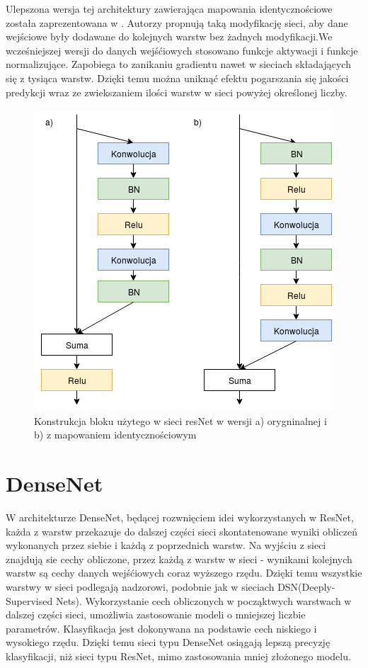 \documentclass[a4paper,11pt,twoside]{report}
\theoremstyle{definition}
\begin{document}
Ulepszona wersja tej architektury zawierająca mapowania identycznościowe została zaprezentowana w \cite{preResnet}. Autorzy propnują taką modyfikację sieci, aby dane wejściowe były dodawane do kolejnych warstw bez żadnych modyfikacji.We wcześniejszej wersji do danych wejśćiowych stosowano funkcje aktywacji i funkcje normalizujące. Zapobiega to zanikaniu gradientu nawet w sieciach składających się z tysiąca warstw. Dzięki temu można uniknąć efektu pogarszania się jakości predykcji wraz ze zwiekszaniem ilości warstw w sieci powyżej określonej liczby.

\begin{figure}[h!]
	\centering
	\includegraphics{resnetBlock}
	\caption{Konstrukcja bloku użytego w sieci resNet w wersji a) orygninalnej i b) z mapowaniem identycznościowym}
\end{figure}

\section{DenseNet}

W architekturze DenseNet, będącej rozwnięciem idei wykorzystanych w ResNet, każda z warstw przekazuje do dalszej części sieci skontatenowane wyniki obliczeń wykonanych przez siebie i każdą z poprzednich warstw. Na wyjściu z sieci znajdują sie cechy obliczone, przez każdą z warstw w sieci - wynikami kolejnych warstw są cechy danych wejśćiowych coraz wyższego rzędu. Dzięki temu wszystkie warstwy w sieci podlegają nadzorowi, podobnie jak w sieciach DSN(Deeply-Supervised Nets)\cite{DSN}. Wykorzystanie cech obliczonych w począktwych warstwach w dalszej części sieci, umożliwia zastosowanie modeli o mniejszej liczbie parametrów. Klasyfikacja jest dokonywana na podstawie cech niskiego i wysokiego rzędu. Dzięki temu sieci typu DenseNet osiągają lepszą precyzję klasyfikacji, niż sieci typu ResNet, mimo zastosowania mniej złożonego modelu\cite{denseNet}. 
\end{document}
